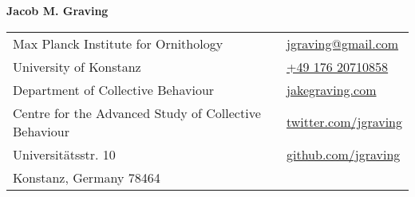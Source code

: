 \documentclass[letterpaper,10pt,oneside]{article}
\begin{document}

\hspace{1mm} \LARGE{\textbf{Jacob M. Graving}}  \\
\normalsize



\begin{center}
\begin{tabular}{l l}
 Max Planck Institute for Ornithology		& \hspace{2in} \href{mailto:jgraving@gmail.com}{\faEnvelope{ } jgraving@gmail.com} \\
 University of Konstanz		& \hspace{2in}   \href{tel:+4917620710858 }{\faPhone{ } +49 176 20710858 }  \\
 Department of Collective Behaviour     & \hspace{2in}  \href{http://jakegraving.com/}{\faGlobe{ } jakegraving.com}   \\
 Centre for the Advanced Study of Collective Behaviour & \hspace{2in}  \href{https://twitter.com/jgraving}{\faTwitter{ }  twitter.com/jgraving}   \\
 Universit\"{a}tsstr. 10             & \hspace{2in} \href{https://github.com/jgraving}{\faGithub{ }  github.com/jgraving} \\
Konstanz, Germany 78464 
\end{tabular}
\end{center}

\end{document}
